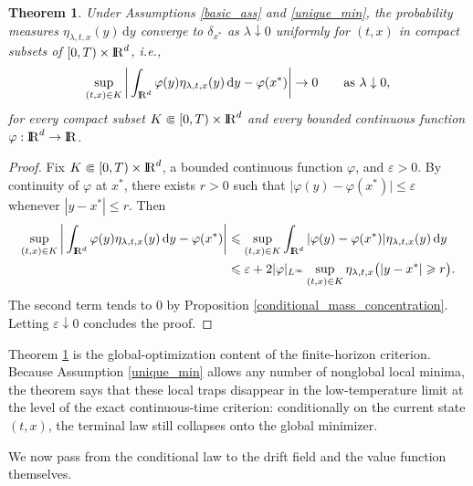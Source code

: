 \documentclass[11pt]{amsart}
\def\R{\mathrm{I\kern-0.21emR}}
\newcommand{\dd}{\,\mathrm{d}}
\renewcommand{\geq}{\geqslant}
\renewcommand{\leq}{\leqslant}
\renewcommand{\Vert}{|}
\numberwithin{equation}{section}
\numberwithin{figure}{section}
\newtheorem{theorem}{Theorem}[section]
\theoremstyle{definition}\newtheorem{remark}[theorem]{Remark}%
\begin{document}
\begin{theorem}\label{conditional_low_temp}
Under Assumptions \ref{basic_ass} and \ref{unique_min}, the probability measures $\eta_{\lambda,t,x}(y)\dd y$ converge to $\delta_{x^*}$ as $\lambda \downarrow 0$ uniformly for $(t,x)$ in compact subsets of $[0,T) \times \R^d$, i.e.,
$$
\sup_{(t,x) \in K} \bigg\vert \int_{\R^d} \varphi(y)\eta_{\lambda,t,x}(y)\dd y - \varphi(x^*) \bigg\vert \to 0
\qquad
\text{as } \lambda \downarrow 0,
$$
for every compact subset $K \Subset [0,T) \times \R^d$ and every bounded continuous function $\varphi : \R^d \to \R$.
\end{theorem}

\begin{proof}
Fix $K \Subset [0,T) \times \R^d$, a bounded continuous function $\varphi$, and $\varepsilon > 0$. By continuity of $\varphi$ at $x^*$, there exists $r > 0$ such that $\vert \varphi(y) - \varphi(x^*) \vert \leq \varepsilon$ whenever $\Vert y - x^* \Vert \leq r$.
Then
\begin{align*}
\sup_{(t,x) \in K} \bigg\vert \int_{\R^d} \varphi(y)\eta_{\lambda,t,x}(y)\dd y - \varphi(x^*) \bigg\vert
&\leq
\sup_{(t,x) \in K}\int_{\R^d} \vert \varphi(y) - \varphi(x^*) \vert \eta_{\lambda,t,x}(y)\dd y \\
&\leq
\varepsilon + 2\Vert \varphi \Vert_{L^\infty} \sup_{(t,x) \in K}\eta_{\lambda,t,x}\big( \Vert y - x^* \Vert \geq r \big).
\end{align*}
The second term tends to $0$ by Proposition \ref{conditional_mass_concentration}. Letting $\varepsilon \downarrow 0$ concludes the proof.
\end{proof}

Theorem \ref{conditional_low_temp} is the global-optimization content of the finite-horizon criterion. Because Assumption \ref{unique_min} allows any number of nonglobal local minima, the theorem says that these local traps disappear in the low-temperature limit at the level of the exact continuous-time criterion: conditionally on the current state $(t,x)$, the terminal law still collapses onto the global minimizer.

We now pass from the conditional law to the drift field and the value function themselves.
\end{document}
